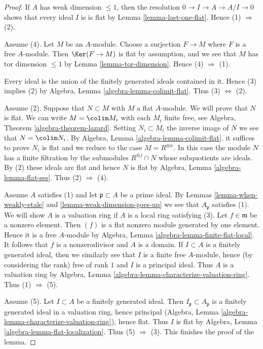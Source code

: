 \begin{proof}
If $A$ has weak dimension $\leq 1$, then the resolution
$0 \to I \to A \to A/I \to 0$ shows that every ideal $I$ is
is flat by Lemma \ref{lemma-last-one-flat}.
Hence (1) $\Rightarrow$ (2).

\medskip\noindent
Assume (4). Let $M$ be an $A$-module. Choose a surjection
$F \to M$ where $F$ is a free $A$-module. Then $\Ker(F \to M)$
is flat by assumption, and we see that $M$ has tor dimension
$\leq 1$ by Lemma \ref{lemma-tor-dimension}.
Hence (4) $\Rightarrow$ (1).

\medskip\noindent
Every ideal is the union of the finitely generated ideals
contained in it. Hence (3) implies (2) by
Algebra, Lemma \ref{algebra-lemma-colimit-flat}.
Thus (3) $\Leftrightarrow$ (2).

\medskip\noindent
Assume (2). Suppose that $N \subset M$ with $M$ a flat $A$-module.
We will prove that $N$ is flat.
We can write $M = \colim M_i$ with each $M_i$ finite free, see
Algebra, Theorem \ref{algebra-theorem-lazard}.
Setting $N_i \subset M_i$ the inverse image of $N$ we see that
$N = \colim N_i$. By
Algebra, Lemma \ref{algebra-lemma-colimit-flat}.
it suffices to prove $N_i$ is flat and we reduce
to the case $M = R^{\oplus n}$. In this case
the module $N$ has a finite filtration by the submodules
$R^{\oplus j} \cap N$ whose subquotients are ideals.
By (2) these ideals are flat and hence $N$ is flat by
Algebra, Lemma \ref{algebra-lemma-flat-ses}. Thus (2) $\Rightarrow$ (4).

\medskip\noindent
Assume $A$ satisfies (1) and let $\mathfrak p \subset A$ be a
prime ideal. By
Lemmas \ref{lemma-when-weakly-etale} and \ref{lemma-weak-dimension-goes-up}
we see that $A_\mathfrak p$ satisfies (1). We will show $A$ is a valuation ring
if $A$ is a local ring satisfying (3). Let $f \in \mathfrak m$
be a nonzero element. Then $(f)$ is a flat nonzero module generated by
one element. Hence it is a free $A$-module by
Algebra, Lemma \ref{algebra-lemma-finite-flat-local}.
It follows that $f$ is a nonzerodivisor and $A$ is a domain.
If $I \subset A$ is a finitely generated ideal, then we similarly
see that $I$ is a finite free $A$-module, hence (by considering the
rank) free of rank $1$ and $I$ is a principal ideal. Thus $A$ is a
valuation ring by
Algebra, Lemma \ref{algebra-lemma-characterize-valuation-ring}.
Thus (1) $\Rightarrow$ (5).

\medskip\noindent
Assume (5). Let $I \subset A$ be a finitely generated ideal.
Then $I_\mathfrak p \subset A_\mathfrak p$ is a finitely generated ideal
in a valuation ring, hence principal
(Algebra, Lemma \ref{algebra-lemma-characterize-valuation-ring}), hence flat.
Thus $I$ is flat by
Algebra, Lemma \ref{algebra-lemma-flat-localization}.
Thus (5) $\Rightarrow$ (3). This finishes the proof of the lemma.
\end{proof}

